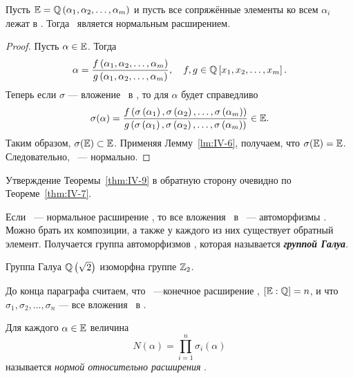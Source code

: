 \begin{ntheorem}
\label{thm:IV-9}
    Пусть $\mathbb{E} = \mathbb{Q}\left( \alpha_1, \alpha_2, \dots, \alpha_m \right)$ и пусть все сопряжённые элементы ко всем $\alpha_i$ лежат в \EE. Тогда \EE~является нормальным расширением.
\end{ntheorem}
\begin{proof}
    Пусть $\alpha \in \mathbb{E}$. Тогда
    \[
        \alpha = \frac{f\left(\alpha_1, \alpha_2, \dots, \alpha_m\right)}{g\left(\alpha_1, \alpha_2, \dots, \alpha_m\right)},
        \quad
        f, g \in \mathbb{Q}\left[x_1, x_2, \dots, x_m\right].
    \]
    Теперь если $\sigma$ --- вложение \EE~в \CC, то для $\alpha$ будет справедливо
    \[
        \sigma(\alpha) = \frac{f\left(\sigma\left(\alpha_1\right), \sigma\left(\alpha_2\right), \dots, \sigma\left(\alpha_m\right)\right)}{g\left(\sigma\left(\alpha_1\right), \sigma\left(\alpha_2\right), \dots, \sigma\left(\alpha_m\right)\right)} \in \mathbb{E}.
    \]
    Таким образом, $\sigma(\mathbb{E}) \subset \mathbb{E}$. Применяя Лемму~\ref{lm:IV-6}, получаем, что $\sigma(\mathbb{E}) = \mathbb{E}$. Следовательно, \EE~--- нормально. 
\end{proof}

\begin{remark}
    Утверждение Теоремы~\ref{thm:IV-9} в обратную сторону очевидно по Теореме~\ref{thm:IV-7}.
\end{remark}

\begin{remark}
    Если \EE~--- нормальное расширение \QQ, то все вложения \EE~в \CC~--- автоморфизмы \EE. Можно брать их композиции, а также у каждого из них существует обратный элемент. Получается группа автоморфизмов \EE, которая называется \textbf{\emph{группой Галуа}}.
\end{remark}

\begin{example}
    Группа Галуа $\mathbb{Q}\left( \sqrt{2} \right)$ изоморфна группе $\mathbb{Z}_2$.
\end{example}

До конца параграфа считаем, что \EE~---конечное расширение \QQ, $[\mathbb{E} : \mathbb{Q}] = n$, и что $\sigma_1, \sigma_2, \dots, \sigma_n$ --- все вложения \EE~в \CC.

\begin{ndefinition}
\label{def:IV_extension-norm}
    Для каждого $\alpha \in \mathbb{E}$ величина
    \[
        N(\alpha) = \prod_{i=1}^{n} \sigma_i(\alpha)
    \]
    называется \emph{нормой относительно расширения \EE}.
\end{ndefinition}

